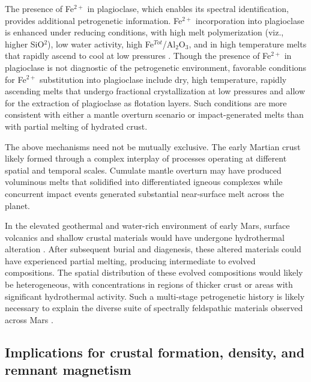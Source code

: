 \documentclass[12pt]{article}
\begin{document}
The presence of Fe$^{2+}$ in plagioclase, which enables its spectral identification, provides additional petrogenetic information. Fe$^{2+}$ incorporation into plagioclase is enhanced under reducing conditions, with high melt polymerization (viz., higher SiO$^2$), low water activity, high Fe$^{Tot}$/Al$_{2}$O$_{3}$, and in high temperature melts that rapidly ascend to cool at low pressures \citep{Wenk1973, Longhi1976, Smith1988, Phinney1992, Ashwal1993, Lundgaard2004}. Though the presence of Fe$^{2+}$ in plagioclase is not diagnostic of the petrogenetic environment, favorable conditions for Fe$^{2+}$ substitution into plagioclase include dry, high temperature, rapidly ascending melts that undergo fractional crystallization at low pressures and allow for the extraction of plagioclase as flotation layers. Such conditions are more consistent with either a mantle overturn scenario or impact-generated melts than with partial melting of hydrated crust.

The above mechanisms need not be mutually exclusive. The early Martian crust likely formed through a complex interplay of processes operating at different spatial and temporal scales. Cumulate mantle overturn may have produced voluminous melts that solidified into differentiated igneous complexes while concurrent impact events generated substantial near-surface melt across the planet.

In the elevated geothermal and water-rich environment of early Mars, surface volcanics and shallow crustal materials would have undergone hydrothermal alteration \citep{Viviano2019, Wu2025}. After subsequent burial and diagenesis, these altered materials could have experienced partial melting, producing intermediate to evolved compositions. The spatial distribution of these evolved compositions would likely be heterogeneous, with concentrations in regions of thicker crust or areas with significant hydrothermal activity. Such a multi-stage petrogenetic history is likely necessary to explain the diverse suite of spectrally feldspathic materials observed across Mars \citep{Carter2013, Wray2013, Rogers2015, Viviano-Beck2017, Farrand2021, Payre2022, Payre2024, Phillips2022, Flahaut2023, Michalski2023}.

\subsection*{Implications for crustal formation, density, and remnant magnetism}
\end{document}
